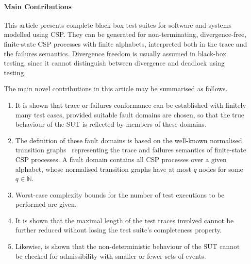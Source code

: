 \documentclass[3p,times]{elsarticle}
\begin{document}

\paragraph{Main Contributions}

This article presents   complete black-box test suites for software and
systems modelled using CSP. They can be generated for non-terminating,
divergence-free, finite-state CSP processes with finite alphabets,
interpreted both in the trace and the failures semantics. Divergence freedom
is usually assumed in black-box testing, since it cannot distinguish between
divergence and deadlock using testing.

The main novel contributions in this article may be summarised as
follows.
\begin{enumerate}
\item It is shown that trace or failures conformance can be established
    with finitely many test cases, provided suitable fault domains are
    chosen, so that the true behaviour of the SUT is reflected by members
    of these domains.

\item The definition of these fault domains is based on the well-known normalised transition graphs~\cite{Roscoe:1994:chapter} representing the  trace and failures semantics of finite-state CSP processes. A fault domain contains all CSP processes over a given alphabet, whose normalised transition graphs have at most $q$ nodes for some $q\in\mathbb{N}$.

\item Worst-case complexity bounds for the number of test executions to be performed are given.

\item It is shown that the maximal length of the test traces involved cannot be further reduced without losing the test suite's completeness property.

\item Likewise, is shown that the non-deterministic behaviour of the SUT cannot be
checked for admissibility with smaller or fewer sets of events.
\end{enumerate}

\end{document}
